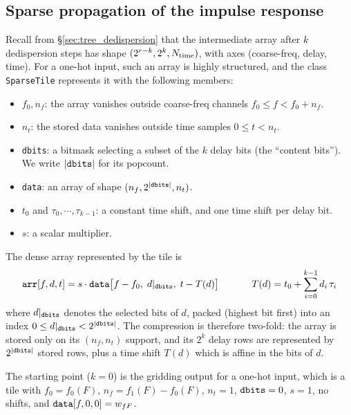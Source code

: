 \documentclass{article}
\numberwithin{equation}{section}   %
\begin{document}
\subsection{Sparse propagation of the impulse response}
\label{sec:avar_sparsetile}

Recall from \S\ref{sec:tree_dedispersion} that the intermediate array after $k$ dedispersion steps
has shape $(2^{r-k}, 2^k, N_{\rm time})$, with axes (coarse-freq, delay, time). For a one-hot
input, such an array is highly structured, and the class \verb|SparseTile| represents it with the
following members:
\begin{itemize}
\item $f_0, n_f$: the array vanishes outside coarse-freq channels $f_0 \le f < f_0 + n_f$.
\item $n_t$: the stored data vanishes outside time samples $0 \le t < n_t$.
\item {\tt dbits}: a bitmask selecting a subset of the $k$ delay bits (the ``content bits'').
We write $|{\tt dbits}|$ for its popcount.
\item {\tt data}: an array of shape $(n_f, 2^{|{\tt dbits}|}, n_t)$.
\item $t_0$ and $\tau_0, \cdots, \tau_{k-1}$: a constant time shift, and one time shift per delay bit.
\item $s$: a scalar multiplier.
\end{itemize}
The dense array represented by the tile is
\begin{equation}
{\tt arr}[f,d,t] = s \cdot {\tt data}\big[ f - f_0, \; d|_{\tt dbits}, \; t - T(d) \big]
  \hspace{1.2cm}
T(d) = t_0 + \sum_{i=0}^{k-1} d_i \, \tau_i
  \label{eq:avar_tile}
\end{equation}
where $d|_{\tt dbits}$ denotes the selected bits of $d$, packed (highest bit first) into an index
$0 \le d|_{\tt dbits} < 2^{|{\tt dbits}|}$.
The compression is therefore two-fold: the array is stored only on its $(n_f, n_t)$ support, and
its $2^k$ delay rows are represented by $2^{|{\tt dbits}|}$ stored rows, plus a time shift $T(d)$
which is affine in the bits of $d$.

The starting point ($k=0$) is the gridding output for a one-hot input, which is a tile with
$f_0 = f_0(F)$, $n_f = f_1(F) - f_0(F)$, $n_t = 1$, ${\tt dbits} = 0$, $s=1$, no shifts, and
${\tt data}[f,0,0] = w_{fF}$.
\end{document}
